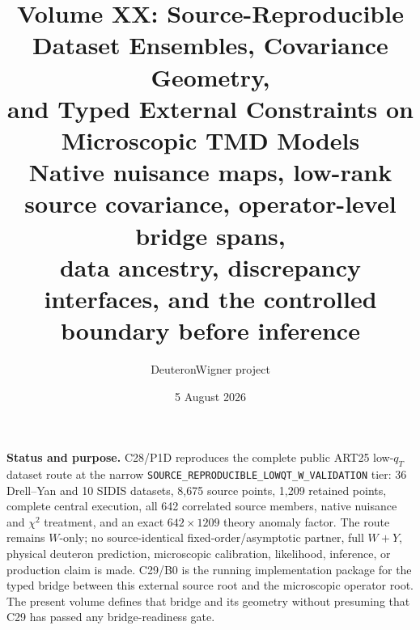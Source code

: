 \documentclass[11pt]{article}
\title{\vspace{-1.0cm}
{\color{navy}\bfseries Volume XX: Source-Reproducible Dataset Ensembles, Covariance Geometry,\\[2mm]
and Typed External Constraints on Microscopic TMD Models}\\[4mm]
\large Native nuisance maps, low-rank source covariance, operator-level bridge spans,\\
data ancestry, discrepancy interfaces, and the controlled boundary before inference}
\author{DeuteronWigner project}
\date{5 August 2026}
\begin{document}
\maketitle

\begin{center}
\begin{minipage}{0.94\textwidth}
\colorbox{softblue}{\parbox{0.96\textwidth}{
\textbf{Status and purpose.}
C28/P1D reproduces the complete public ART25 low-\(q_T\) dataset route at the narrow \texttt{SOURCE\_REPRODUCIBLE\_LOWQT\_W\_VALIDATION} tier: 36 Drell--Yan and 10 SIDIS datasets, 8,675 source points, 1,209 retained points, complete central execution, all 642 correlated source members, native nuisance and \(\chi^2\) treatment, and an exact \(642\times1209\) theory anomaly factor.  The route remains \(W\)-only; no source-identical fixed-order/asymptotic partner, full \(W+Y\), physical deuteron prediction, microscopic calibration, likelihood, inference, or production claim is made.  C29/B0 is the running implementation package for the typed bridge between this external source root and the microscopic operator root.  The present volume defines that bridge and its geometry without presuming that C29 has passed any bridge-readiness gate.
}}
\end{minipage}
\end{center}
\end{document}
